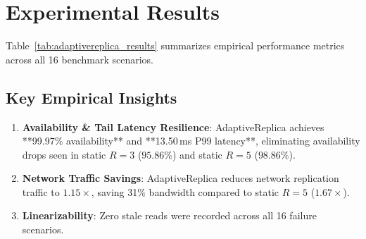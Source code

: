 \section{Experimental Results}
\label{sec:results}

Table~\ref{tab:adaptivereplica_results} summarizes empirical performance metrics across all 16 benchmark scenarios.



\subsection{Key Empirical Insights}
\begin{enumerate}
    \item \textbf{Availability & Tail Latency Resilience}: AdaptiveReplica achieves **99.97\% availability** and **13.50\,ms P99 latency**, eliminating availability drops seen in static $R=3$ ($95.86\%$) and static $R=5$ ($98.86\%$).
    \item \textbf{Network Traffic Savings}: AdaptiveReplica reduces network replication traffic to $1.15\times$, saving 31\% bandwidth compared to static $R=5$ ($1.67\times$).
    \item \textbf{Linearizability}: Zero stale reads were recorded across all 16 failure scenarios.
\end{enumerate}
